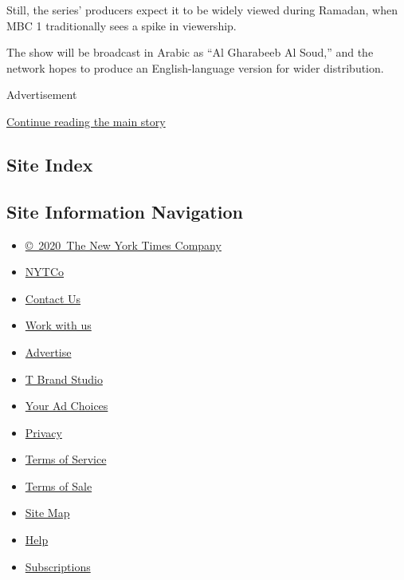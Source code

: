 Still, the series' producers expect it to be widely viewed during
Ramadan, when MBC 1 traditionally sees a spike in viewership.

The show will be broadcast in Arabic as ``Al Gharabeeb Al Soud,'' and
the network hopes to produce an English-language version for wider
distribution.

Advertisement

\protect\hyperlink{after-bottom}{Continue reading the main story}

\hypertarget{site-index}{%
\subsection{Site Index}\label{site-index}}

\hypertarget{site-information-navigation}{%
\subsection{Site Information
Navigation}\label{site-information-navigation}}

\begin{itemize}
\tightlist
\item
  \href{https://help.nytimes.com/hc/en-us/articles/115014792127-Copyright-notice}{©~2020~The
  New York Times Company}
\end{itemize}

\begin{itemize}
\tightlist
\item
  \href{https://www.nytco.com/}{NYTCo}
\item
  \href{https://help.nytimes.com/hc/en-us/articles/115015385887-Contact-Us}{Contact
  Us}
\item
  \href{https://www.nytco.com/careers/}{Work with us}
\item
  \href{https://nytmediakit.com/}{Advertise}
\item
  \href{http://www.tbrandstudio.com/}{T Brand Studio}
\item
  \href{https://www.nytimes.com/privacy/cookie-policy\#how-do-i-manage-trackers}{Your
  Ad Choices}
\item
  \href{https://www.nytimes.com/privacy}{Privacy}
\item
  \href{https://help.nytimes.com/hc/en-us/articles/115014893428-Terms-of-service}{Terms
  of Service}
\item
  \href{https://help.nytimes.com/hc/en-us/articles/115014893968-Terms-of-sale}{Terms
  of Sale}
\item
  \href{https://spiderbites.nytimes.com}{Site Map}
\item
  \href{https://help.nytimes.com/hc/en-us}{Help}
\item
  \href{https://www.nytimes.com/subscription?campaignId=37WXW}{Subscriptions}
\end{itemize}
